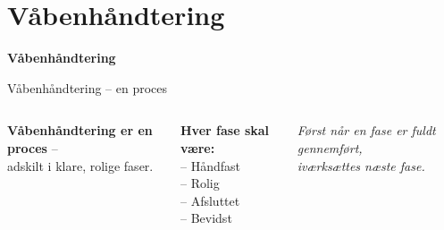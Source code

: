 \section{Våbenhåndtering}

\begin{frame}
  \vspace{3em}
  \begin{center}
    {\LARGE \textbf{Våbenhåndtering}}
  \end{center}
\end{frame}

\begin{frame}{Våbenhåndtering – en proces}
  \vspace{1em}
  \begin{columns}[T]

    \setlength{\parskip}{0.6em}
    \small
    \RaggedRight

    \textbf{Våbenhåndtering er en proces} – \\
    adskilt i klare, rolige faser. \par

    \vspace{0.6em}
    \textbf{Hver fase skal være:} \\
    \quad – Håndfast \\
    \quad – Rolig \\
    \quad – Afsluttet \\
    \quad – Bevidst \par

    \vspace{0.6em}
    \textit{Først når en fase er fuldt gennemført, \\
    iværksættes næste fase.} \par

    

  \end{columns}
\end{frame}


